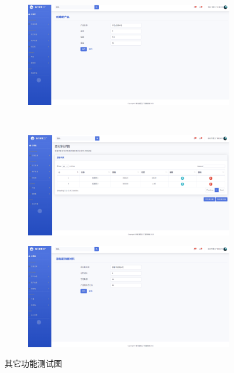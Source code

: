 \begin{figure}[H]
\begin{subfigure}{.35\textwidth}
    \end{subfigure}
    \qquad
    \begin{subfigure}{.35\textwidth}
        \centering
        \includegraphics[width=\textwidth]{figures/6addnewproduct.png}
    \end{subfigure}
    \\
    \begin{subfigure}{.35\textwidth}
        \centering
        \includegraphics[width=\textwidth]{figures/6viewallmaterial.png}
    \end{subfigure}
    \qquad
    \begin{subfigure}{.35\textwidth}
        \centering
        \includegraphics[width=\textwidth]{figures/6addnewmaterial.png}
    \end{subfigure}
    \caption{其它功能测试图}
    \label{fig:otstst}
\end{figure}

